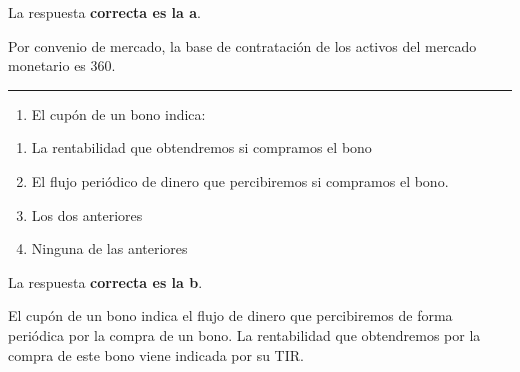 \documentclass[
  letterpaper,
  DIV=11,
  numbers=noendperiod]{scrreprt}
\providecommand{\tightlist}{%
  \setlength{\itemsep}{0pt}\setlength{\parskip}{0pt}}\usepackage{longtable,booktabs,array}
\begin{document}
\begin{tcolorbox}[enhanced jigsaw, left=2mm, opacityback=0, colback=white, breakable, arc=.35mm, bottomrule=.15mm, rightrule=.15mm, toprule=.15mm, leftrule=.75mm, colframe=quarto-callout-tip-color-frame]
\begin{minipage}[t]{5.5mm}
\textcolor{quarto-callout-tip-color}{\faLightbulb}
\end{minipage}%
\begin{minipage}[t]{\textwidth - 5.5mm}

La respuesta \textbf{correcta es la a}.

Por convenio de mercado, la base de contratación de los activos del
mercado monetario es 360.

\end{minipage}%
\end{tcolorbox}

\begin{center}\rule{0.5\linewidth}{0.5pt}\end{center}

\begin{enumerate}
\def\labelenumi{\arabic{enumi}.}
\setcounter{enumi}{75}
\tightlist
\item
  El cupón de un bono indica:
\end{enumerate}

\begin{enumerate}
\def\labelenumi{\alph{enumi})}
\item
  La rentabilidad que obtendremos si compramos el bono
\item
  El flujo periódico de dinero que percibiremos si compramos el bono.
\item
  Los dos anteriores
\item
  Ninguna de las anteriores
\end{enumerate}

\begin{tcolorbox}[enhanced jigsaw, left=2mm, opacityback=0, colback=white, breakable, arc=.35mm, bottomrule=.15mm, rightrule=.15mm, toprule=.15mm, leftrule=.75mm, colframe=quarto-callout-tip-color-frame]
\begin{minipage}[t]{5.5mm}
\textcolor{quarto-callout-tip-color}{\faLightbulb}
\end{minipage}%
\begin{minipage}[t]{\textwidth - 5.5mm}

La respuesta \textbf{correcta es la b}.

El cupón de un bono indica el flujo de dinero que percibiremos de forma
periódica por la compra de un bono. La rentabilidad que obtendremos por
la compra de este bono viene indicada por su TIR.

\end{minipage}%
\end{tcolorbox}
\end{document}
